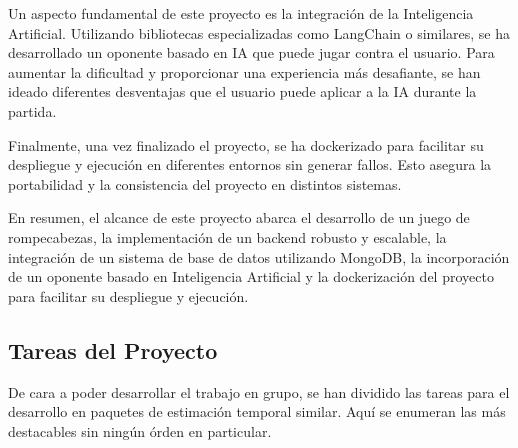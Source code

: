 \documentclass[12pt,epsf,titlepage,a4paper]{article}
\begin{document}
Un aspecto fundamental de este proyecto es la integración de la Inteligencia Artificial. Utilizando bibliotecas especializadas como LangChain o similares, se ha desarrollado un oponente basado en IA que puede jugar contra el usuario. Para aumentar la dificultad y proporcionar una experiencia más desafiante, se han ideado diferentes desventajas que el usuario puede aplicar a la IA durante la partida.

Finalmente, una vez finalizado el proyecto, se ha dockerizado para facilitar su despliegue y ejecución en diferentes entornos sin generar fallos. Esto asegura la portabilidad y la consistencia del proyecto en distintos sistemas.

En resumen, el alcance de este proyecto abarca el desarrollo de un juego de rompecabezas, la implementación de un backend robusto y escalable, la integración de un sistema de base de datos utilizando MongoDB, la incorporación de un oponente basado en Inteligencia Artificial y la dockerización del proyecto para facilitar su despliegue y ejecución.

\subsection{Tareas del Proyecto} \label{tareaslista}

De cara a poder desarrollar el trabajo en grupo, se han dividido las tareas para el desarrollo en paquetes de estimación temporal similar. Aquí se enumeran las más destacables sin ningún órden en particular.
\end{document}

